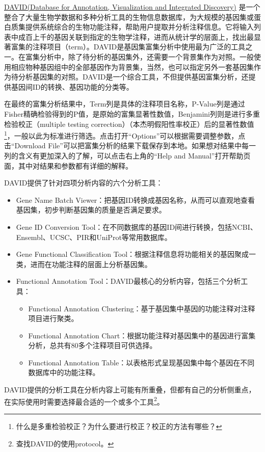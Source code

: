\documentclass[11pt,a4paper,twoside]{book}
\begin{document}
\href{http://david.abcc.ncifcrf.gov/}{DAVID(Database for Annotation, Visualization and Integrated Discovery)} 是一个整合了大量生物学数据和多种分析工具的生物信息数据库，为大规模的基因集或蛋白质集提供系统综合的生物功能注释，帮助用户提取并分析注释信息。它将输入列表中成百上千的基因关联到指定的生物学注释，进而从统计学的层面上，找出最显著富集的注释项目（term）。DAVID是基因集富集分析中使用最为广泛的工具之一。在富集分析中，除了待分析的基因集外，还需要一个背景集作为对照。一般使用相应物种基因组中的全部基因作为背景集，当然，也可以指定另外一套基因集作为待分析基因集的对照。DAVID是一个综合工具，不但提供基因富集分析，还提供基因间ID的转换、基因功能的分类等。

在最终的富集分析结果中，Term列是具体的注释项目名称，P-Value列是通过Fisher精确检验得到的P值，是原始的富集显著性数值，Benjamini列则是进行多重检验校正（multiple testing correction）（本杰明假阳性率校正）后的显著性数值\footnote{什么是多重检验校正？为什么要进行校正？校正的方法有哪些？}，一般以此为标准进行筛选。点击打开“Options”可以根据需要调整参数，点击“Download File”可以把富集分析的结果下载保存到本地。如果想对结果中每一列的含义有更加深入的了解，可以点击右上角的“Help and Manual”打开帮助页面，其中对结果和参数都有详细的解释。

DAVID提供了针对四项分析内容的六个分析工具：
\begin{itemize}
  \item Gene Name Batch Viewer：把基因ID转换成基因名称，从而可以直观地查看基因集，初步判断基因集的质量是否满足要求。
  \item Gene ID Conversion Tool：在不同数据库的基因ID间进行转换，包括NCBI、Ensembl、UCSC、PIR和UniProt等常用数据库。
  \item Gene Functional Classification Tool：根据注释信息将功能相关的基因聚成一类，进而在功能注释的层面上分析基因集。
  \item Functional Annotation Tool：DAVID最核心的分析内容，包括三个分析工具：
  \begin{itemize}
    \item Functional Annotation Clustering：基于基因集中基因的功能注释对注释项目进行聚类。
    \item Functional Annotation Chart：根据功能注释对基因集中的基因进行富集分析，总共有80多个注释项目可供选择。
    \item Functional Annotation Table：以表格形式呈现基因集中每个基因在不同数据库中的功能注释。
  \end{itemize}
\end{itemize}

DAVID提供的分析工具在分析内容上可能有所重叠，但都有自己的分析侧重点，在实际使用时需要选择最合适的一个或多个工具\footnote{查找DAVID的使用protocol。}。
\end{document}
